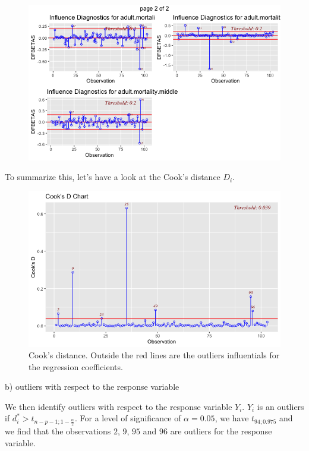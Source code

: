 \begin{figure}[H]
	\centering
	\includegraphics{figures/models/dfbetas_2.png}
	\caption{}
	\label{fig:dfbetas2}
\end{figure}

To summarize this, let's have a look at the Cook's distance $D_i$.

\begin{figure}[H]
	\centering
	\includegraphics{figures/models/cooks.png}
	\caption{Cook's distance. Outside the red lines are the outliers influentials for the regression coefficients.}
	\label{fig:cooks_distance}
\end{figure}

b) outliers with respect to the response variable

We then identify outliers with respect to the response variable $Y_i$. $Y_i$ is an outliers if $d_i^{\ast} > t_{n-p-1;1 - \frac{\alpha}{2}}$. For a level of significance of $\alpha = 0.05$, we have $t_{94 ; 0.975}$ and we find that the observations $2$, $9$, $95$ and $96$ are outliers for the response variable.

